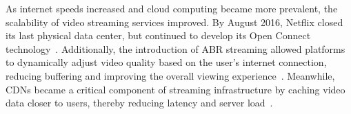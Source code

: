 As internet speeds increased and cloud computing became more prevalent, the scalability of video streaming services improved. By August 2016, Netflix closed its last physical data center, but continued to develop its Open Connect technology~\parencite{netflix_cloud}.
Additionally, the introduction of \ac{ABR} streaming allowed platforms to dynamically adjust video quality based on the user's internet connection, reducing buffering and improving the overall viewing experience~\parencite{abr}. Meanwhile, \ac{CDN}s became a critical component of streaming infrastructure by caching video data closer to users, thereby reducing latency and server load~\parencite{cdn_basic}.




